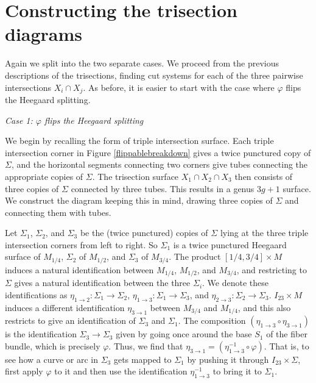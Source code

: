 \documentclass[12pt]{amsart}
\theoremstyle{definition}
\theoremstyle{remark}
\begin{document}
\section{Constructing the trisection diagrams}
\label{sec_diagrams}

Again we split into the two separate cases.
We proceed from the previous descriptions of the trisections, finding cut systems for each of the three pairwise intersections $X_i \cap X_j$.
As before, it is easier to start with the case where $\varphi$ flips the Heegaard splitting.

\smallskip
\noindent\textit{Case 1: $\varphi$ flips the Heegaard splitting}\ \

We begin by recalling the form of triple intersection surface.
Each triple intersection corner in Figure \ref{flippablebreakdown} gives a twice punctured copy of $\Sigma$, and the horizontal segments connecting two corners give tubes connecting the appropriate copies of $\Sigma$.
The trisection surface $X_1 \cap X_2 \cap X_3$ then consists of three copies of $\Sigma$ connected by three tubes.
This results in a genus $3g+1$ surface.
We construct the diagram keeping this in mind, drawing three copies of $\Sigma$ and connecting them with tubes.


Let $\Sigma_1$, $\Sigma_2$, and $\Sigma_3$ be the (twice punctured) copies of $\Sigma$ lying at the three triple intersection corners from left to right.
So $\Sigma_1$ is a twice punctured Heegaard surface of $M_{1/4}$, $\Sigma_2$ of $M_{1/2}$, and $\Sigma_3$ of $M_{3/4}$.
The product $[1/4, 3/4] \times M$ induces a natural identification between $M_{1/4}$, $M_{1/2}$, and $M_{3/4}$, and restricting to $\Sigma$ gives a natural identification between the three $\Sigma_i$.
We denote these identifications as $\eta_{1 \to 2}\colon \Sigma_1 \to \Sigma_2$, $\eta_{1 \to 3}\colon \Sigma_1 \to \Sigma_3$, and $\eta_{2 \to 3}\colon \Sigma_2 \to \Sigma_3$.
$I_{23} \times M$ induces a different identification $\eta_{3 \to 1}$ between $M_{3/4}$ and $M_{1/4}$, and this also restricts to give an identification of $\Sigma_3$ and $\Sigma_1$.
The composition $(\eta_{1 \to 3} \circ \eta_{3 \to 1})$ is the identification $\Sigma_3 \to \Sigma_3$ given by going once around the base $S_1$ of the fiber bundle, which is precisely $\varphi$.
Thus, we find that $\eta_{3 \to 1} = (\eta_{1 \to 3}^{-1} \circ \varphi)$.
That is, to see how a curve or arc in $\Sigma_3$ gets mapped to $\Sigma_1$ by pushing it through $I_{23} \times \Sigma$, first apply $\varphi$ to it and then use the identification $\eta_{1 \to 3}^{-1}$ to bring it to $\Sigma_1$.
\end{document}
